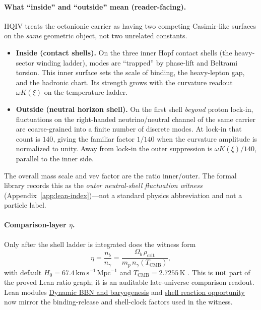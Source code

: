 \documentclass[11pt]{amsart}
\newcommand{\LeanEng}[2]{\hyperref[#1]{#2}}
\begin{document}
\paragraph{What ``inside'' and ``outside'' mean (reader-facing).}
HQIV treats the octonionic carrier as having two competing Casimir-like
surfaces on the \emph{same} geometric object, not two unrelated constants.
\begin{itemize}[leftmargin=2em]
\item \textbf{Inside (contact shells).}
  On the three inner Hopf contact shells (the heavy-sector winding
  ladder), modes are ``trapped'' by phase-lift and Beltrami torsion.
  This inner surface sets the scale of binding, the heavy-lepton gap,
  and the hadronic chart.  Its strength grows with the curvature
  readout $\omega K(\xi)$ on the temperature ladder.
\item \textbf{Outside (neutral horizon shell).}
  On the first shell \emph{beyond} proton lock-in, fluctuations on the
  right-handed neutrino/neutral channel of the same carrier are
  coarse-grained into a finite number of discrete modes.  At lock-in
  that count is $140$, giving the familiar factor $1/140$ when the
  curvature amplitude is normalized to unity.  Away from lock-in the
  outer suppression is $\omega K(\xi)/140$, parallel to the inner side.
\end{itemize}
The overall mass scale and vev factor are the ratio inner/outer.  The
formal library records this as the \emph{outer neutral-shell fluctuation
witness} (Appendix~\ref{app:lean-index})---not a standard physics
abbreviation and not a particle label.

\paragraph{Comparison-layer $\eta$.}
Only after the shell ladder is integrated does the witness form
\[
\eta = \frac{n_b}{n_\gamma}
  = \frac{\Omega_b\,\rho_{\mathrm{crit}}}{m_p\,n_\gamma(T_{\mathrm{CMB}})},
\]
with default $H_0=67.4\,\mathrm{km\,s^{-1}\,Mpc^{-1}}$ and
$T_{\mathrm{CMB}}=2.7255\,\mathrm{K}$ \cite{planck2018cosmo,pdg2024}. This is \textbf{not} part of the
proved Lean ratio graph; it is an auditable late-universe comparison
readout. Lean modules
\LeanEng{lean:dynamic-bbn}{Dynamic BBN and baryogenesis} and
\LeanEng{lean:bbn-shell-opportunity}{shell reaction opportunity} now
mirror the binding-release and shell-clock factors used in the witness.
\end{document}
